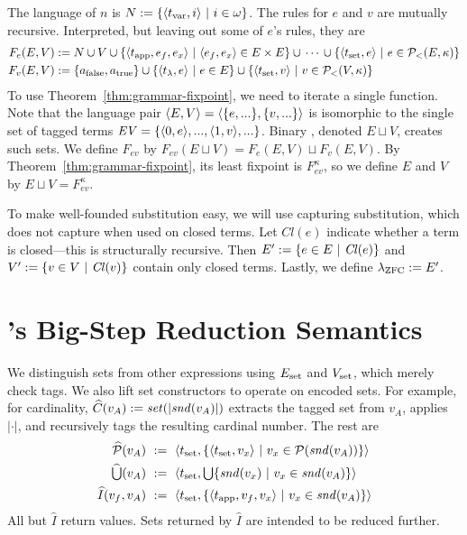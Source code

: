 The language of $n$ is $N := \lbrace {\langle{t_\mathrm{var},i}\rangle} \ \lvert\ {i \in \omega} \rbrace$. The rules for $e$ and $v$ are mutually recursive. Interpreted, but leaving out some of $e$'s rules, they are
\begin{equation}
\begin{aligned}
  F_e(E,V) &:= N \cup V \cup \lbrace {\langle{t_\mathrm{app},e_f,e_x}\rangle} \ \lvert\ {\langle{e_f,e_x}\rangle \in E \times E} \rbrace \cup\, \cdots\, \cup \lbrace {\langle{t_\mathrm{set},e}\rangle} \ \lvert\ {e \in \mathcal{P}_<(E,\kappa)} \rbrace \\
  F_v(E,V) &:= \{{a_\mathrm{false},a_\mathrm{true}}\} \cup \lbrace {\langle{t_\lambda,e}\rangle} \ \lvert\ {e \in E} \rbrace \cup
    \lbrace {\langle{t_\mathrm{set},v}\rangle} \ \lvert\ {v \in \mathcal{P}_<(V,\kappa)} \rbrace
\end{aligned}
\end{equation}
To use Theorem~\ref{thm:grammar-fixpoint}, we need to iterate a single function. Note that the language pair $\langle{E,V}\rangle = \langle{\{{e,...}\},\{{v,...}\}}\rangle$ is isomorphic to the single set of tagged terms $\mathit{EV} = \{{\langle{0,e}\rangle,...,\langle{1,v}\rangle,...}\}$. Binary , denoted $E \sqcup V$, creates such sets. We define $F_\mathit{ev}$ by $F_\mathit{ev}(E \sqcup V) = F_e(E,V) \sqcup F_v(E,V)$. By Theorem~\ref{thm:grammar-fixpoint}, its least fixpoint is $F_\mathit{ev}^\kappa$, so we define $E$ and $V$ by $E \sqcup V = F_\mathit{ev}^\kappa$.

To make well-founded substitution easy, we will use capturing substitution, which does not capture when used on closed terms. Let $\mathit{Cl}(e)$ indicate whether a term is closed---this is structurally recursive. Then $E' := \lbrace {e \in E} \ \lvert\ {\mathit{Cl}(e)} \rbrace$ and $V' := \lbrace {v \in V} \ \lvert\ {\mathit{Cl}(v)} \rbrace$ contain only closed terms. Lastly, we define $\lambda_{\text{ZFC}} := E'$.


\section{\targetlang's Big-Step Reduction Semantics}

\newcommand{\encpowerset}{\widehat{\powerset}}
\newcommand{\encunion}{\widehat{\textstyle\U}}
\newcommand{\encimage}{\widehat{I}}
\newcommand{\enccard}{\widehat{C}}
\newcommand{\subst}{\myfun{subst}}

We distinguish sets from other expressions using $E_\mathrm{set}$ and $V_\mathrm{set}$, which merely check tags. We also lift set constructors to operate on encoded sets. For example, for cardinality, $\enccard(v_A) \metadef \encset(|\snd(v_A)|)$ extracts the tagged set from $v_A$, applies $|\cdot|$, and recursively tags the resulting cardinal number. The rest are
\begin{equation}
\begin{aligned}
	\encpowerset(v_A) &\ \metadef\ \pair{\tset,\setb{\pair{\tset,v_x}}{v_x \in \powerset(\snd(v_A))}} \\
	\encunion(v_A) &\ \metadef\ \pair{\tset,\textstyle\U \setb{\snd(v_x)}{v_x \in \snd(v_A)}} \\
	\encimage(v_f,v_A) &\ \metadef\ \pair{\tset,\setb{\pair{\tapp,v_f,v_x}}{v_x \in \snd(v_A)}}
\end{aligned}
\end{equation}
All but $\encimage$ return values. Sets returned by $\encimage$ are intended to be reduced further.

